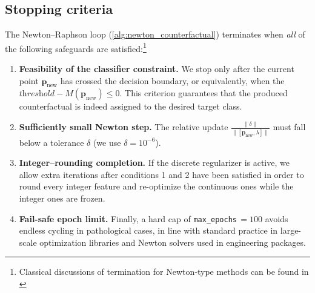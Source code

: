 \documentclass[12pt]{extarticle}
\numberwithin{equation}{section}
\begin{document}
\subsection{Stopping criteria}\label{sec:stopping}

The Newton–Raphson loop (\autoref{alg:newton_counterfactual}) terminates when
\emph{all} of the following safeguards are satisfied:\footnote{Classical
discussions of termination for Newton‐type methods can be found in
\cite{numopt}}

\begin{enumerate}
  \item \textbf{Feasibility of the classifier constraint.}  
        We stop only after the current point $\mathbf{p}_{\text{new}}$ has crossed the decision boundary, or equivalently, when the $\textit{threshold}-M(\mathbf{p}_{\text{new}})\le 0$. This criterion guarantees that the produced counterfactual is indeed assigned to the desired target class.
  \item \textbf{Sufficiently small Newton step.}  
        The relative update $\tfrac{\lVert\delta\rVert}{\lVert[\mathbf{p}_{\text{new}},\lambda]\rVert}$ must fall below a tolerance $\delta$ (we use $\delta=10^{-6}$). 
  \item \textbf{Integer–rounding completion.}  
        If the discrete regularizer is active, we allow extra iterations after conditions 1 and 2 have been satisfied in order to round every integer feature and re-optimize the continuous ones while the integer ones are frozen.
  \item \textbf{Fail-safe epoch limit.}
        Finally, a hard cap of \texttt{max\_epochs}\,$=100$ avoids endless cycling in pathological cases, in line with standard practice in large-scale optimization libraries \cite{scipyopt} and Newton solvers used in engineering packages.
\end{enumerate}
\end{document}
